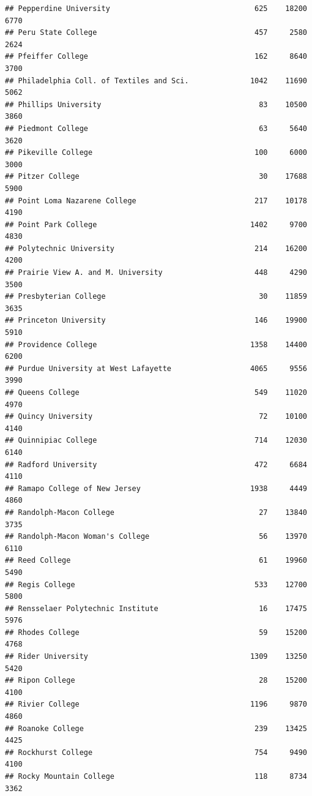 \documentclass[
]{article}
\begin{document}
\begin{verbatim}
## Pepperdine University                                 625    18200       6770
## Peru State College                                    457     2580       2624
## Pfeiffer College                                      162     8640       3700
## Philadelphia Coll. of Textiles and Sci.              1042    11690       5062
## Phillips University                                    83    10500       3860
## Piedmont College                                       63     5640       3620
## Pikeville College                                     100     6000       3000
## Pitzer College                                         30    17688       5900
## Point Loma Nazarene College                           217    10178       4190
## Point Park College                                   1402     9700       4830
## Polytechnic University                                214    16200       4200
## Prairie View A. and M. University                     448     4290       3500
## Presbyterian College                                   30    11859       3635
## Princeton University                                  146    19900       5910
## Providence College                                   1358    14400       6200
## Purdue University at West Lafayette                  4065     9556       3990
## Queens College                                        549    11020       4970
## Quincy University                                      72    10100       4140
## Quinnipiac College                                    714    12030       6140
## Radford University                                    472     6684       4110
## Ramapo College of New Jersey                         1938     4449       4860
## Randolph-Macon College                                 27    13840       3735
## Randolph-Macon Woman's College                         56    13970       6110
## Reed College                                           61    19960       5490
## Regis College                                         533    12700       5800
## Rensselaer Polytechnic Institute                       16    17475       5976
## Rhodes College                                         59    15200       4768
## Rider University                                     1309    13250       5420
## Ripon College                                          28    15200       4100
## Rivier College                                       1196     9870       4860
## Roanoke College                                       239    13425       4425
## Rockhurst College                                     754     9490       4100
## Rocky Mountain College                                118     8734       3362

\end{verbatim}
\end{document}
